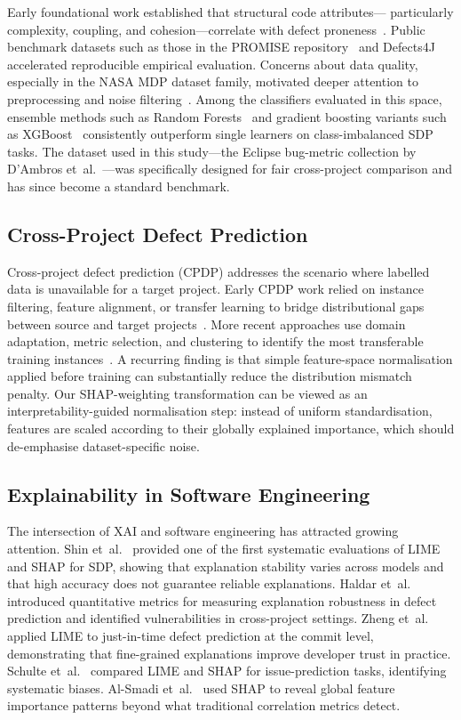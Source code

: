 \documentclass[12pt, a4paper]{article}
\begin{document}
Early foundational work established that structural code attributes---
particularly complexity, coupling, and cohesion---correlate with defect
proneness~\cite{ostrand2005,hall2012}. Public benchmark datasets such as
those in the PROMISE repository~\cite{promise} and
Defects4J~\cite{just2014} accelerated reproducible empirical evaluation.
Concerns about data quality, especially in the NASA MDP dataset family,
motivated deeper attention to preprocessing and noise
filtering~\cite{shepperd2017,shepperd2013}. Among the classifiers evaluated
in this space, ensemble methods such as Random Forests~\cite{breiman2001}
and gradient boosting variants such as XGBoost~\cite{chen2016} consistently
outperform single learners on class-imbalanced SDP tasks. The dataset used
in this study---the Eclipse bug-metric collection by D'Ambros et~al.\
\cite{dambros2012}---was specifically designed for fair cross-project
comparison and has since become a standard benchmark.

\subsection{Cross-Project Defect Prediction}

Cross-project defect prediction (CPDP) addresses the scenario where labelled
data is unavailable for a target project. Early CPDP work relied on instance
filtering, feature alignment, or transfer learning to bridge distributional
gaps between source and target projects~\cite{kamei2017,jureczko2015}. More
recent approaches use domain adaptation, metric selection, and clustering to
identify the most transferable training
instances~\cite{xu2016,taskeen2023}. A recurring finding is that simple
feature-space normalisation applied before training can substantially reduce
the distribution mismatch penalty. Our SHAP-weighting transformation can be
viewed as an interpretability-guided normalisation step: instead of uniform
standardisation, features are scaled according to their globally explained
importance, which should de-emphasise dataset-specific noise.

\subsection{Explainability in Software Engineering}

The intersection of XAI and software engineering has attracted growing
attention. Shin et~al.~\cite{shin2021} provided one of the first systematic
evaluations of LIME and SHAP for SDP, showing that explanation stability
varies across models and that high accuracy does not guarantee reliable
explanations. Haldar et~al.~\cite{haldar2023} introduced quantitative
metrics for measuring explanation robustness in defect prediction and
identified vulnerabilities in cross-project settings. Zheng et~al.\
\cite{zheng2022} applied LIME to just-in-time defect prediction at the
commit level, demonstrating that fine-grained explanations improve developer
trust in practice. Schulte et~al.~\cite{schulte2024} compared LIME and SHAP
for issue-prediction tasks, identifying systematic biases. Al-Smadi
et~al.~\cite{alsmadi2023} used SHAP to reveal global feature importance
patterns beyond what traditional correlation metrics detect.
\end{document}
